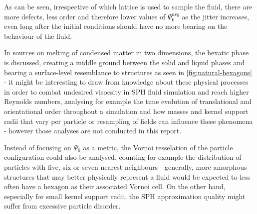 As can be seen, irrespective of which lattice is used to sample the fluid, there are more defects, less order and therefore lower values of $\Psi_6^{avg}$ as the jitter increases, even long after the initial conditions should have no more bearing on the behaviour of the fluid.

In sources on melting of condensed matter in two dimensions, the hexatic phase is discussed, creating a middle ground between the solid and liquid phases and bearing a surface-level resemblance to structures as seen in \autoref{fig:natural-hexagons} - it might be interesting to draw from knowledge about these physical processes in order to combat undesired visocsity in SPH fluid simulation and reach higher Reynolds numbers, analysing for example the time evolution of translational and orientational order throughout a simulation and how masses and kernel support radii that vary per particle or resampling of fields can influence these phenomena - however those analyses are not conducted in this report.

Instead of focusing on $\Psi_6$ as a metric, the Vornoi tesselation of the particle configuration could also be analysed, counting for example the distribution of particles with five, six or seven nearest neighbours - generally, more amorphous structures that may better physically represent a fluid would be expected to less often have a hexagon as their associated Vornoi cell. On the other hand, especially for small kernel support radii, the SPH approximation quality might suffer from excessive particle disorder.
